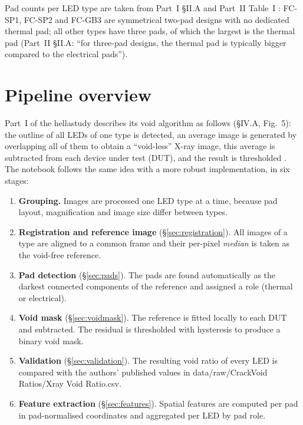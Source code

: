 \documentclass[11pt,a4paper]{article}
\newcommand{\code}[1]{{\ttfamily\def\_{\textunderscore\allowbreak}#1}}
\begin{document}
Pad counts per LED type are taken from Part~I \S II.A and Part~II Table~I \cite{part1,part2}:
FC-SP1, FC-SP2 and FC-GB3 are symmetrical two-pad designs with no dedicated thermal pad; all
other types have three pads, of which the largest is the thermal pad (Part~II \S II.A: ``for
three-pad designs, the thermal pad is typically bigger compared to the electrical pads'').

\section{Pipeline overview}

Part~I of the hellastudy describes its void algorithm as follows (\S IV.A, Fig.~5): the outline
of all LEDs of one type is detected, an average image is generated by overlapping all of them to
obtain a ``void-less'' X-ray image, this average is subtracted from each device under test
(DUT), and the result is thresholded \cite{part1}. The notebook follows the same idea with a
more robust implementation, in six stages:

\begin{enumerate}
  \item \textbf{Grouping.} Images are processed one LED type at a time, because pad layout,
        magnification and image size differ between types.
  \item \textbf{Registration and reference image} (\S\ref{sec:registration}). All images of a
        type are aligned to a common frame and their per-pixel \emph{median} is taken as the
        void-free reference.
  \item \textbf{Pad detection} (\S\ref{sec:pads}). The pads are found automatically as the
        darkest connected components of the reference and assigned a role
        (thermal or electrical).
  \item \textbf{Void mask} (\S\ref{sec:voidmask}). The reference is fitted locally to each DUT
        and subtracted. The residual is thresholded with hysteresis to produce a binary void
        mask.
  \item \textbf{Validation} (\S\ref{sec:validation}). The resulting void ratio of every LED is
        compared with the authors' published values in
        \code{data/raw/CrackVoid Ratios/Xray Void Ratio.csv}.
  \item \textbf{Feature extraction} (\S\ref{sec:features}). Spatial features are computed per pad
        in pad-normalised coordinates and aggregated per LED by pad role.
\end{enumerate}
\end{document}
